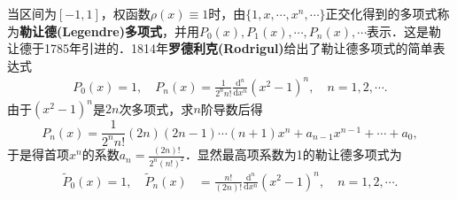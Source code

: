 \documentclass[../../main.tex]{subfiles}%
\begin{document}
\begin{definition}
当区间为$[-1,1]$，权函数$\rho(x) \equiv 1$时，由$\{1,x,\cdots,x^n,\cdots\}$正交化得到的多项式称为\textbf{勒让德(Legendre)多项式}，并用$P_0(x),P_1(x),\cdots,P_n(x),\cdots$表示．这是勒让德于1785年引进的．1814年\textbf{罗德利克(Rodrigul)}给出了勒让德多项式的简单表达式
\begin{align}\label{eq:数值分析-3-2.5}
P_0(x) = 1,\quad P_n(x) = \frac{1}{2^n n!} \frac{\mathrm{d}^n}{\mathrm{d}x^n}(x^2 - 1)^n,\quad n = 1,2,\cdots.
\end{align}
由于$(x^2 - 1)^n$是$2n$次多项式，求$n$阶导数后得
$$P_n(x) = \frac{1}{2^n n!}(2n)(2n - 1)\cdots(n + 1)x^n + a_{n-1}x^{n-1} + \cdots + a_0,$$
于是得首项$x^n$的系数$a_n = \frac{(2n)!}{2^n (n!)^2}$．显然最高项系数为1的勒让德多项式为
\begin{align}\label{eq:数值分析-3-2.6}
\widetilde{P}_0(x) = 1,\quad \widetilde{P}_n(x) &= \frac{n!}{(2n)!} \frac{\mathrm{d}^n}{\mathrm{d}x^n}(x^2 - 1)^n,\quad n = 1,2,\cdots.
\end{align}
\end{definition}
\end{document}

